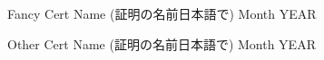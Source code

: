 \begin{CJK}{UTF8}{min}
Fancy Cert Name (証明の名前日本語で) \hfill Month YEAR

Other Cert Name (証明の名前日本語で) \hfill Month YEAR
\end{CJK}
